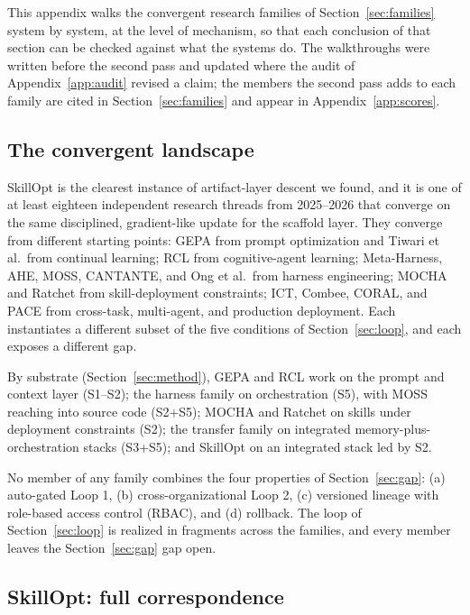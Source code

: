 \documentclass[
  11pt,
]{article}
\begin{document}
This appendix walks the convergent research families of Section~\ref{sec:families} system by system, at the level of mechanism, so that each conclusion of that section can be checked against what the systems do. The walkthroughs were written before the second pass and updated where the audit of Appendix~\ref{app:audit} revised a claim; the members the second pass adds to each family are cited in Section~\ref{sec:families} and appear in Appendix~\ref{app:scores}.

\subsection{The convergent landscape}\label{app:families-1}

SkillOpt \cite{yang2026skillopt} is the clearest instance of artifact-layer descent we found, and it is one of at least eighteen independent research threads from 2025--2026 that converge on the same disciplined, gradient-like update for the scaffold layer. They converge from different starting points: GEPA from prompt optimization and Tiwari et al.~from continual learning; RCL from cognitive-agent learning; Meta-Harness, AHE, MOSS, CANTANTE, and Ong et al.~from harness engineering; MOCHA and Ratchet from skill-deployment constraints; ICT, Combee, CORAL, and PACE from cross-task, multi-agent, and production deployment. Each instantiates a different subset of the five conditions of Section~\ref{sec:loop}, and each exposes a different gap.

By substrate (Section~\ref{sec:method}), GEPA and RCL work on the prompt and context layer (S1--S2); the harness family on orchestration (S5), with MOSS reaching into source code (S2+S5); MOCHA and Ratchet on skills under deployment constraints (S2); the transfer family on integrated memory-plus-orchestration stacks (S3+S5); and SkillOpt on an integrated stack led by S2.

No member of any family combines the four properties of Section~\ref{sec:gap}: (a) auto-gated Loop 1, (b) cross-organizational Loop 2, (c) versioned lineage with role-based access control (RBAC), and (d) rollback. The loop of Section~\ref{sec:loop} is realized in fragments across the families, and every member leaves the Section~\ref{sec:gap} gap open.

\subsection{SkillOpt: full correspondence}\label{app:families-2}
\end{document}
